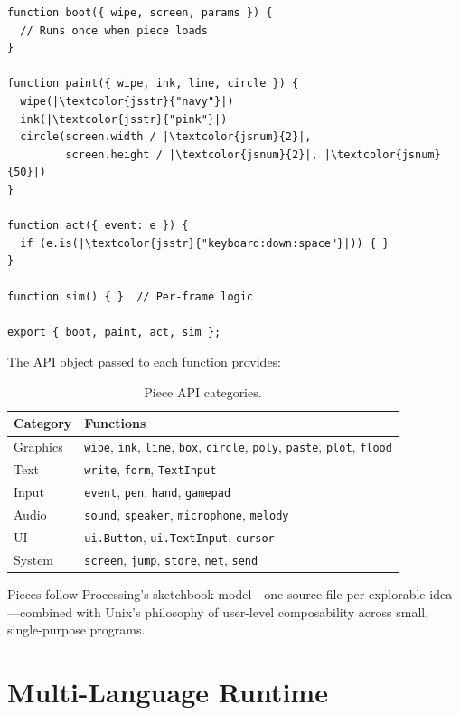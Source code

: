 \documentclass[10pt,letterpaper,twocolumn]{article}
\begin{document}
\begin{lstlisting}[style=acjsstyle]
function boot({ wipe, screen, params }) {
  // Runs once when piece loads
}

function paint({ wipe, ink, line, circle }) {
  wipe(|\textcolor{jsstr}{"navy"}|)
  ink(|\textcolor{jsstr}{"pink"}|)
  circle(screen.width / |\textcolor{jsnum}{2}|,
         screen.height / |\textcolor{jsnum}{2}|, |\textcolor{jsnum}{50}|)
}

function act({ event: e }) {
  if (e.is(|\textcolor{jsstr}{"keyboard:down:space"}|)) { }
}

function sim() { }  // Per-frame logic

export { boot, paint, act, sim };
\end{lstlisting}

The API object passed to each function provides:

\begin{table}[h]
\small
\centering
\begin{tabularx}{\columnwidth}{lX}
\toprule
\textbf{Category} & \textbf{Functions} \\
\midrule
Graphics & \texttt{wipe}, \texttt{ink}, \texttt{line}, \texttt{box}, \texttt{circle}, \texttt{poly}, \texttt{paste}, \texttt{plot}, \texttt{flood} \\
Text & \texttt{write}, \texttt{form}, \texttt{TextInput} \\
Input & \texttt{event}, \texttt{pen}, \texttt{hand}, \texttt{gamepad} \\
Audio & \texttt{sound}, \texttt{speaker}, \texttt{microphone}, \texttt{melody} \\
UI & \texttt{ui.Button}, \texttt{ui.TextInput}, \texttt{cursor} \\
System & \texttt{screen}, \texttt{jump}, \texttt{store}, \texttt{net}, \texttt{send} \\
\bottomrule
\end{tabularx}
\caption{Piece API categories.}
\label{tab:api}
\end{table}

Pieces follow Processing's sketchbook model---one source file per explorable idea---combined with Unix's philosophy of user-level composability across small, single-purpose programs.


\section{Multi-Language Runtime}
\label{sec:languages}
\end{document}
